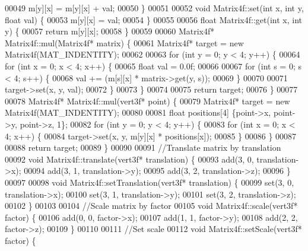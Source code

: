 \begin{DoxyCode}
00049     m[y][x] = m[y][x] + val;
00050 \}
00051 
00052 \textcolor{keywordtype}{void} Matrix4f::set(\textcolor{keywordtype}{int} x, \textcolor{keywordtype}{int} y, \textcolor{keywordtype}{float} val) \{
00053     m[y][x] = val;
00054 \}
00055 
00056 \textcolor{keywordtype}{float} Matrix4f::get(\textcolor{keywordtype}{int} x, \textcolor{keywordtype}{int} y) \{
00057     \textcolor{keywordflow}{return} m[y][x];
00058 \}
00059 
00060 Matrix4f* Matrix4f::mul(Matrix4f* matrix) \{
00061     Matrix4f* target = \textcolor{keyword}{new} Matrix4f(MAT\_INDENTITY);
00062 
00063     \textcolor{keywordflow}{for} (\textcolor{keywordtype}{int} y = 0; y < 4; y++) \{
00064         \textcolor{keywordflow}{for} (\textcolor{keywordtype}{int} x = 0; x < 4; x++) \{
00065             \textcolor{keywordtype}{float} val = 0.0f;
00066 
00067             \textcolor{keywordflow}{for} (\textcolor{keywordtype}{int} s = 0; s < 4; s++) \{
00068                 val += (m[s][x] * matrix->get(y, s));
00069             \}
00070 
00071             target->set(x, y, val);
00072         \}
00073     \}
00074 
00075     \textcolor{keywordflow}{return} target;
00076 \}
00077 
00078 Matrix4f* Matrix4f::mul(vert3f* point) \{
00079     Matrix4f* target = \textcolor{keyword}{new} Matrix4f(MAT\_INDENTITY);
00080 
00081     \textcolor{keywordtype}{float} positions[4] \{point->x, point->y, point->z, 1\};
00082     \textcolor{keywordflow}{for} (\textcolor{keywordtype}{int} y = 0; y < 4; y++) \{
00083         \textcolor{keywordflow}{for} (\textcolor{keywordtype}{int} x = 0; x < 4; x++) \{
00084             target->set(x, y, m[y][x] * positions[x]);
00085         \}
00086     \}
00087 
00088     \textcolor{keywordflow}{return} target;
00089 \}
00090         
00091 \textcolor{comment}{//Translate matrix by translation}
00092 \textcolor{keywordtype}{void} Matrix4f::translate(vert3f* translation) \{
00093     add(3, 0, translation->x);
00094     add(3, 1, translation->y);
00095     add(3, 2, translation->z);
00096 \}
00097 
00098 \textcolor{keywordtype}{void} Matrix4f::setTranslation(vert3f* translation) \{
00099     \textcolor{keyword}{set}(3, 0, translation->x);
00100     \textcolor{keyword}{set}(3, 1, translation->y);
00101     \textcolor{keyword}{set}(3, 2, translation->z);
00102 \}
00103 
00104 \textcolor{comment}{//Scale matrix by factor}
00105 \textcolor{keywordtype}{void} Matrix4f::scale(vert3f* factor) \{
00106     add(0, 0, factor->x);
00107     add(1, 1, factor->y);
00108     add(2, 2, factor->z);
00109 \}
00110 
00111 \textcolor{comment}{//Set scale}
00112 \textcolor{keywordtype}{void} Matrix4f::setScale(vert3f* factor) \{

\end{DoxyCode}
